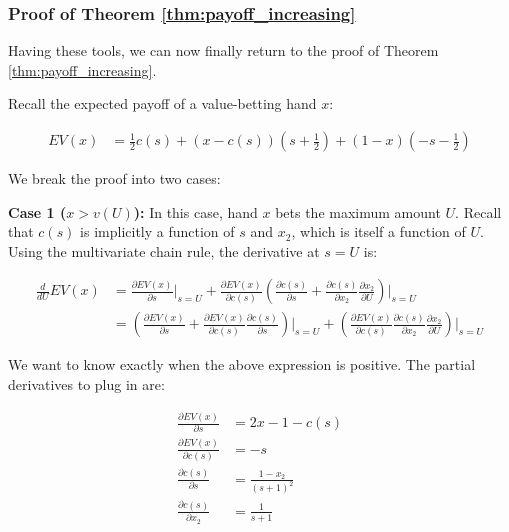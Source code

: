\documentclass[../../main/main.tex]{subfiles}
\begin{document}
\subsubsection{Proof of Theorem \ref{thm:payoff_increasing}}

Having these tools, we can now finally return to the proof of Theorem \ref{thm:payoff_increasing}.

\begin{customproof}
    Recall the expected payoff of a value-betting hand $x$:

    \begin{align*}
        EV(x) & = \frac{1}{2} c(s) + (x - c(s)) \left(s+\frac{1}{2}\right) + (1-x) \left(-s-\frac{1}{2}\right)
    \end{align*}

    We break the proof into two cases:

    \textbf{Case 1 ($x > v(U)$):} In this case, hand $x$ bets the maximum amount $U$. Recall that $c(s)$ is implicitly a function of $s$ and $x_2$, which is itself a function of $U$. Using the multivariate chain rule, the derivative at $s=U$ is:

    \begin{align*}
        \frac{d}{dU} EV(x) & = \frac{\partial EV(x)}{\partial s} \bigg|_{s=U} + \frac{\partial EV(x)}{\partial c(s)} \left( \frac{\partial c(s)}{\partial s} + \frac{\partial c(s)}{\partial x_2} \frac{\partial x_2}{\partial U} \right) \bigg|_{s=U} \\
        & = \left( \frac{\partial EV(x)}{\partial s} + \frac{\partial EV(x)}{\partial c(s)} \frac{\partial c(s)}{\partial s}\right)\bigg|_{s=U}   +  \left( \frac{\partial EV(x)}{\partial c(s)} \frac{\partial c(s)}{\partial x_2} \frac{\partial x_2}{\partial U} \right) \bigg|_{s=U}
    \end{align*} 

    We want to know exactly when the above expression is positive. The partial derivatives to plug in are:

    \begin{align*}
        \frac{\partial EV(x)}{\partial s} & = 2x - 1 - c(s) \\
        \frac{\partial EV(x)}{\partial c(s)} & = - s \\ 
        \frac{\partial c(s)}{\partial s} & = \frac{1-x_2}{(s+1)^2} \\
        \frac{\partial c(s)}{\partial x_2} & = \frac{1}{s+1} \\
    \end{align*}


\end{customproof}
\end{document}
